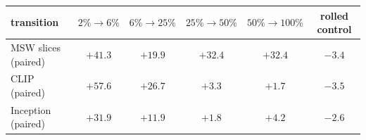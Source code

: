 \begin{tabular}{lccccc}
\toprule
transition & $2\%\!\to\!6\%$ & $6\%\!\to\!25\%$ & $25\%\!\to\!50\%$ & $50\%\!\to\!100\%$ & rolled control \\
\midrule
MSW slices (paired) & $+41.3$ & $+19.9$ & $\mathbf{+32.4}$ & $\mathbf{+32.4}$ & $-3.4$ \\
CLIP (paired) & $\mathbf{+57.6}$ & $\mathbf{+26.7}$ & $+3.3$ & $+1.7$ & $-3.5$ \\
Inception (paired) & $+31.9$ & $+11.9$ & $+1.8$ & $+4.2$ & $-2.6$ \\
\bottomrule
\end{tabular}
